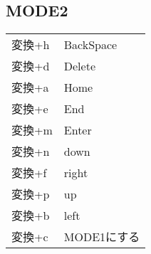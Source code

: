 \documentclass[11pt]{article}
\begin{document}
\subsection{MODE2}
\label{sec:orgd8793ae}
\begin{center}
\begin{tabular}{ll}
変換+h & BackSpace\\
変換+d & Delete\\
変換+a & Home\\
変換+e & End\\
変換+m & Enter\\
変換+n & down\\
変換+f & right\\
変換+p & up\\
変換+b & left\\
変換+c & MODE1にする\\
\end{tabular}
\end{center}
\end{document}
